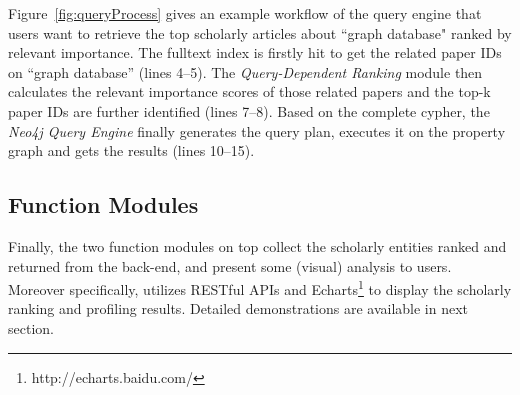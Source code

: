 Figure~\ref{fig:queryProcess} gives an example workflow of the query engine that users want to retrieve the top scholarly articles about ``graph database"  ranked by relevant importance. The fulltext index is firstly hit to get the related paper IDs on ``graph database'' (lines 4--5). The {\em Query-Dependent Ranking} module then calculates the relevant importance scores of those related papers and the top-k paper IDs are further identified (lines 7--8). Based on the complete cypher, the {\em Neo4j Query Engine} finally generates the query plan, executes it on the property graph and gets the results (lines 10--15).

\subsection{Function Modules}
Finally, the two function modules on top collect the scholarly entities ranked and returned from the back-end, and present some (visual) analysis to users. Moreover specifically, \oursystem utilizes RESTful APIs  and Echarts\footnote{http://echarts.baidu.com/} to display the scholarly ranking and profiling results. Detailed demonstrations are available in next section.






